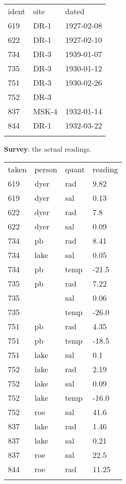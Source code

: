 \documentclass{book}
\begin{document}
\begin{tabular}{lll}
\hline\noalign{\medskip}
ident & site & dated
\\\noalign{\medskip}
\hline\noalign{\medskip}
619 & DR-1 & 1927-02-08
\\\noalign{\medskip}
622 & DR-1 & 1927-02-10
\\\noalign{\medskip}
734 & DR-3 & 1939-01-07
\\\noalign{\medskip}
735 & DR-3 & 1930-01-12
\\\noalign{\medskip}
751 & DR-3 & 1930-02-26
\\\noalign{\medskip}
752 & DR-3 & ~
\\\noalign{\medskip}
837 & MSK-4 & 1932-01-14
\\\noalign{\medskip}
844 & DR-1 & 1932-03-22
\\\noalign{\medskip}
\hline
\end{tabular}

\textbf{Survey}: the actual readings.

\begin{tabular}{llll}
\hline\noalign{\medskip}
taken & person & quant & reading
\\\noalign{\medskip}
\hline\noalign{\medskip}
619 & dyer & rad & 9.82
\\\noalign{\medskip}
619 & dyer & sal & 0.13
\\\noalign{\medskip}
622 & dyer & rad & 7.8
\\\noalign{\medskip}
622 & dyer & sal & 0.09
\\\noalign{\medskip}
734 & pb & rad & 8.41
\\\noalign{\medskip}
734 & lake & sal & 0.05
\\\noalign{\medskip}
734 & pb & temp & -21.5
\\\noalign{\medskip}
735 & pb & rad & 7.22
\\\noalign{\medskip}
735 & ~ & sal & 0.06
\\\noalign{\medskip}
735 & ~ & temp & -26.0
\\\noalign{\medskip}
751 & pb & rad & 4.35
\\\noalign{\medskip}
751 & pb & temp & -18.5
\\\noalign{\medskip}
751 & lake & sal & 0.1
\\\noalign{\medskip}
752 & lake & rad & 2.19
\\\noalign{\medskip}
752 & lake & sal & 0.09
\\\noalign{\medskip}
752 & lake & temp & -16.0
\\\noalign{\medskip}
752 & roe & sal & 41.6
\\\noalign{\medskip}
837 & lake & rad & 1.46
\\\noalign{\medskip}
837 & lake & sal & 0.21
\\\noalign{\medskip}
837 & roe & sal & 22.5
\\\noalign{\medskip}
844 & roe & rad & 11.25
\\\noalign{\medskip}
\hline
\end{tabular}
\end{document}

